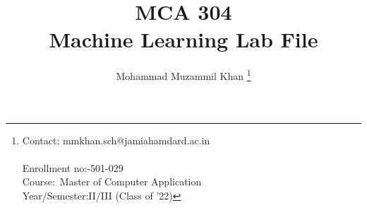 \documentclass[11pt,a4paper]{book}
\title{MCA 304\\Machine Learning Lab File\\}
\begin{document}
    \author {
        Mohammad Muzammil Khan \footnote {
            Contact: mmkhan.sch@jamiahamdard.ac.in\\\\
            Enrollment no:-501-029\\
            Course:\quad \quad \quad \quad \ Master of Computer Application\\
            Year/Semester:\quad II/III (Class of '22)
        }
    }
    \date{}

    \maketitle    
    \tableofcontents
    
    
    
    
    
    
    
\end{document}
